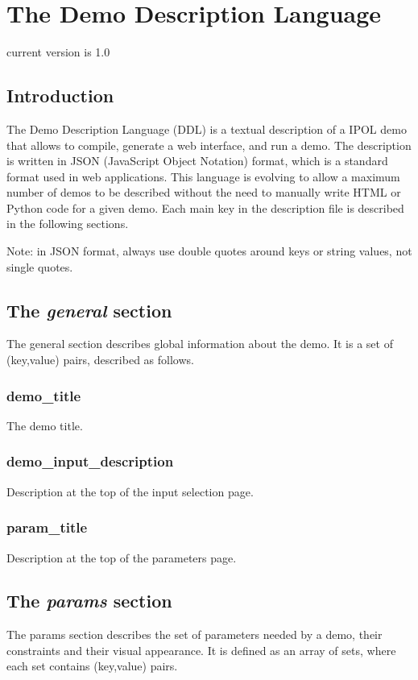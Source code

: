 \section{The Demo Description Language}

current version is 1.0

\subsection{Introduction}
The Demo Description Language (DDL) is a textual description of a IPOL demo that 
allows to compile, generate a web interface, and run a demo. The description is 
written in JSON (JavaScript Object Notation) format, which is a standard format 
used in web applications. This language is evolving to allow a maximum number 
of demos to be described without the need to manually write HTML or Python code 
for a given demo. Each main key in the description file is described in the 
following sections.


{\bd Note:} in JSON format, always use double quotes around keys or string 
values, not single quotes.

\subsection{The \emph{general} section}
The general section describes global information about the demo. It is a set of 
(key,value) pairs, described as follows.
\subsubsection{demo\_title}
The demo title.
\subsubsection{demo\_input\_description}
Description at the top of the input selection page.
\subsubsection{param\_title}
Description at the top of the parameters page.

\subsection{The \emph{params} section}
The params section describes the set of parameters needed by a demo, their 
constraints and their visual appearance. It is defined as an array of sets, 
where each set contains (key,value) pairs.

